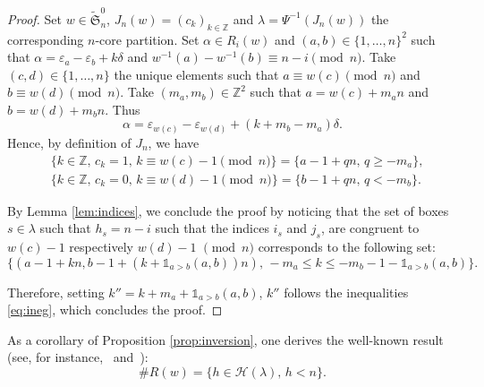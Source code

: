 \documentclass[pdftex]{sigma}
\numberwithin{equation}{section}
\def\cch{\mathcal H}
\newcommand{\Z}{\mathbb{Z}}
\begin{document}
\begin{proof}
Set $w\in\widetilde{\mathfrak{S}}^0_n$, $J_n(w)=(c_k)_{k\in\Z}$ and $\lambda=\Psi^{-1}(J_n(w))$ the corresponding $n$-core partition. Set $\alpha\in R_i(w)$ and $(a,b)\in\lbrace 1,\dots,n\rbrace^2$ such that $\alpha=\varepsilon_a-\varepsilon_b+k\delta$
and $w^{-1}(a)-w^{-1}(b)\equiv n-i\pmod{n}$. Take $(c,d)\in\lbrace 1,\dots,n\rbrace$ the unique elements such that $a\equiv w(c)\pmod{n}$ and $b\equiv w(d)\pmod{n}$. Take $(m_a,m_b)\in\Z^2$ such that $a=w(c)+m_an$ and $b=w(d)+m_bn$. Thus
\[\alpha=\varepsilon_{w(c)}-\varepsilon_{w(d)}+(k+m_b-m_a)\delta.\]
Hence, by definition of $J_n$, we have
\begin{align*}
&\lbrace k\in \Z,\, c_{k}=1,\, k\equiv w(c)-1\pmod{n}\rbrace=\lbrace a-1+qn,\, q\geq -m_a\rbrace,\\
&\lbrace k\in \Z,\, c_{k}=0,\, k\equiv w(d)-1\pmod{n}\rbrace=\lbrace b-1+qn,\, q< -m_b\rbrace.
\end{align*}


By Lemma \ref{lem:indices}, we conclude the proof by noticing that the set of boxes $s\in\lambda$ such that $h_s=n-i$ such that the indices $i_s$ and $j_s$, are congruent to $w(c)-1$ respectively $w(d)-1$ $\pmod{n}$ corresponds to the following set:
\[\lbrace (a-1+kn,b-1+(k+\mathds{1}_{a>b}(a,b))n),\, -m_a\leq k \leq -m_b-1-\mathds{1}_{a>b}(a,b)\rbrace.
\]


Therefore, setting $k''=k+m_a+\mathds{1}_{a>b}(a,b)$, $k''$ follows the inequalities \eqref{eq:ineg}, which concludes the proof.
\end{proof}


\begin{Remark}
As a corollary of Proposition \ref{prop:inversion}, one derives the well-known result (see, for instance,~\cite[Proposition $1.3$]{LLMSSZ} and~\cite[Theorem $7$]{LapointeMorse}):
\[\#R(w)=\lbrace h\in\cch(\lambda),\, h<n\rbrace.\]
\end{Remark}
\end{document}
